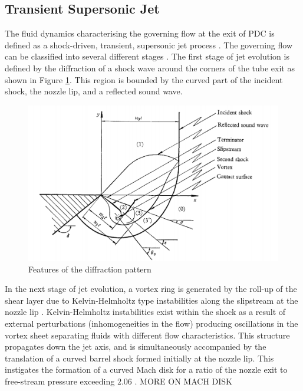 \subsection{Transient Supersonic Jet}
The fluid dynamics characterising the governing flow at the exit of PDC is defined as a shock-driven, transient, supersonic jet process \citep{radulescu2007transient}. The governing flow can be classified into several different stages \citep{ishii1999experimental}. The first stage of jet evolution is defined by the diffraction of a shock wave around the corners of the tube exit as shown in Figure \ref{fig:0}. This region is bounded by the curved part of the incident shock, the nozzle lip, and a reflected sound wave. 
\begin{figure}[h]  
\centering
\includegraphics[scale=0.9]{fig0.PNG}
\caption{Features of the diffraction pattern \citep{skews1967perturbed}}
\label{fig:0}
\end{figure}
In the next stage of jet evolution, a vortex ring is generated by the roll-up of the shear layer due to Kelvin-Helmholtz type instabilities along the slipstream at the nozzle lip \citep{elder1952experimental,dora2014role}. Kelvin-Helmholtz instabilities exist within the shock as a result of external perturbations (inhomogeneities in the flow) producing oscillations in the vortex sheet separating fluids with different flow characteristics. This structure propagates down the jet axis, and is simultaneously accompanied by the translation of a curved barrel shock formed initially at the nozzle lip. This instigates the formation of a curved Mach disk for a ratio of the nozzle exit to free-stream pressure exceeding $2.06$ \citep{matsuda1987numerical}. MORE ON MACH DISK

